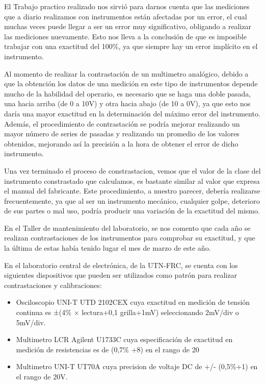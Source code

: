 El Trabajo practico realizado nos sirvió para darnos cuenta que las mediciones que a diario realizamos con instrumentos están afectadas por un error, el cual muchas veces puede llegar a ser un error muy significativo, obligando a realizar las mediciones nuevamente.
Esto nos lleva a la conclusión de que es imposible trabajar con una exactitud del 100\%, ya que siempre hay un error implícito en el instrumento. 

Al momento de realizar la contrastación de un multimetro analógico, debido a que la obtención los datos de una medición en este tipo de instrumentos depende mucho de la habilidad del operario, es necesario que se haga una doble pasada, una hacia arriba (de 0 a 10V) y otra hacia abajo (de 10 a 0V), ya que esto nos daría una mayor exactitud en la determinación del máximo error del instrumento. 
Además, el procedimiento de contrastación se podría mejorar realizando un mayor número de series de pasadas y realizando un promedio de los valores obtenidos,  mejorando así la precisión a la hora de obtener el error de dicho instrumento. 

Una vez terminado el proceso de constrastacion, vemos que el valor de la clase del instrumento constrastado que calculamos, es bastante similar al valor que expresa el manual del fabricante. 
Este procedimiento, a nuestro parecer, debería realizarse frecuentemente, ya que al ser un instrumento mecánico, cualquier golpe, deterioro de sus partes o mal uso, podría producir una variación de la exactitud del mismo. 

En el Taller de mantenimiento del laboratorio, se nos comento que cada año se realizan contrastaciones de los instrumentos para comprobar su exactitud, y que la última de estas había tenido lugar el mes de marzo de este año.  

En el laboratorio central de electrónica, de la UTN-FRC, se cuenta con los siguientes dispositivos que pueden ser utilizados como patrón para realizar contrastaciones y calibraciones:
\begin{itemize}
    \item Osciloscopio UNI-T UTD 2102CEX cuya exactitud en medición de tensión continua es ±(4\% × lectura+0,1 grilla+1mV) seleccionando 2mV/div o 5mV/div.
    \item Multimetro LCR Agilent U1733C cuya especificación de exactitud en medición de resistencias es de (0,7\% +8) en el rango de 20\ohm
    \item Multimetro UNI-T UT70A cuya precision de voltaje DC de +/- (0,5\%+1) en el rango de 20V. 
\end{itemize}


